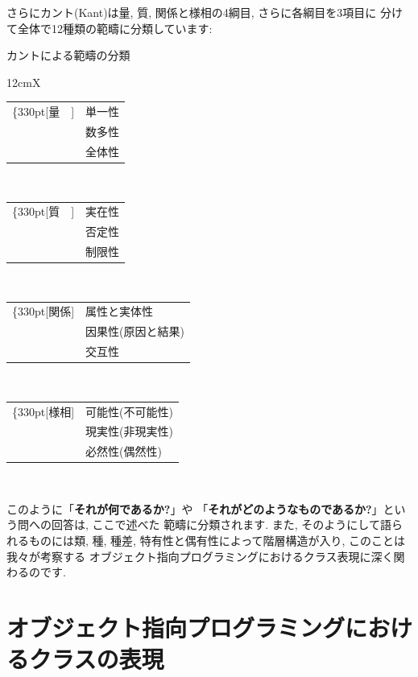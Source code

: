 \documentclass[b5j,8pt,twocolumn]{ltjsarticle}
\begin{document}
さらにカント(Kant)は量, 質, 関係と様相の4綱目, さらに各綱目を3項目に
分けて全体で12種類の範疇に分類しています\cite{藤野}:


\begin{itembox}[c]{カントによる範疇の分類}
{\footnotesize
\begin{tabularx}{12cm}{X}
\begin{tabular}[t]{rl}
\ldelim\{{3}{30pt}[量　]&
単一性\\
&数多性\\
&全体性\\
\end{tabular}
\\
\begin{tabular}[t]{rl}
\ldelim\{{3}{30pt}[質　]&
実在性\\
&否定性\\
&制限性\\
\end{tabular}
\\
\begin{tabular}[t]{rl}
\ldelim\{{3}{30pt}[関係]&
属性と実体性\\
&因果性(原因と結果)\\
&交互性\\
\end{tabular}
\\
\begin{tabular}[t]{rl}
\ldelim\{{3}{30pt}[様相]&
可能性(不可能性)\\
&現実性(非現実性)\\
&必然性(偶然性)\\
\end{tabular}
\\
\end{tabularx}
}
\end{itembox}


このように「\textbf{それが何であるか?}」や
「\textbf{それがどのようなものであるか?}」という問への回答は, ここで述べた
範疇に分類されます. また, そのようにして語られるものには類, 種, 種差,
 特有性と偶有性によって階層構造が入り, このことは我々が考察する
オブジェクト指向プログラミングにおけるクラス表現に深く関わるのです.

\section{オブジェクト指向プログラミングにおけるクラスの表現}
\end{document}
